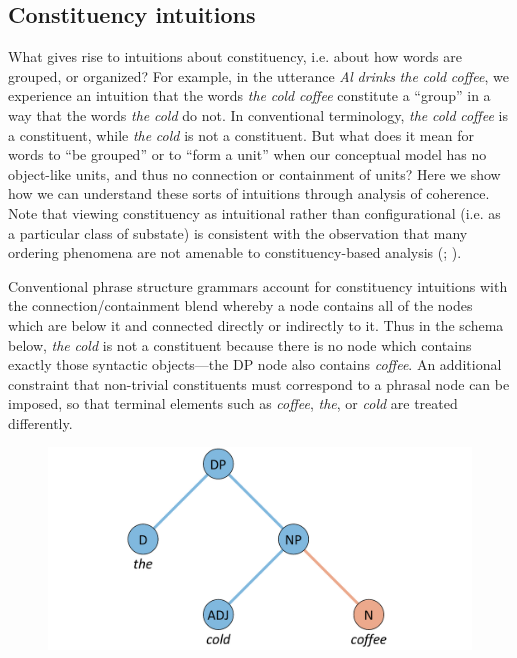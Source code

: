 \subsection{Constituency intuitions}

What gives rise to intuitions about constituency, i.e. about how words are grouped, or organized? For example, in the utterance \textit{Al} \textit{drinks} \textit{the} \textit{cold} \textit{coffee}, we experience an intuition that the words \textit{the} \textit{cold} \textit{coffee} constitute a “group” in a way that the words \textit{the} \textit{cold} do not. In conventional terminology, \textit{the} \textit{cold} \textit{coffee} is a constituent, while \textit{the} \textit{cold} is not a constituent. But what does it mean for words to “be grouped” or to “form a unit” when our conceptual model has no object-like units, and thus no connection or containment of units? Here we show how we can understand these sorts of intuitions through analysis of coherence. Note that viewing constituency as intuitional rather than configurational (i.e. as a particular class of substate) is consistent with the observation that many ordering phenomena are not amenable to constituency-based analysis (\citealt{Langacker1997}; \citealt{Phillips2003}).

  Conventional phrase structure grammars account for constituency intuitions with the connection/containment blend whereby a node contains all of the nodes which are below it and connected directly or indirectly to it. Thus in the schema below, \textit{the} \textit{cold} is not a constituent because there is no node which contains exactly those syntactic objects—the DP node also contains \textit{coffee}. An additional constraint that non-trivial constituents must correspond to a phrasal node can be imposed, so that terminal elements such as \textit{coffee}, \textit{the}, or \textit{cold} are treated differently. 

  
\begin{figure}
\includegraphics[width=\textwidth]{figures/Tilsen-img136.png}
\caption{\missingcaption}
\label{fig:}
\end{figure}
 

